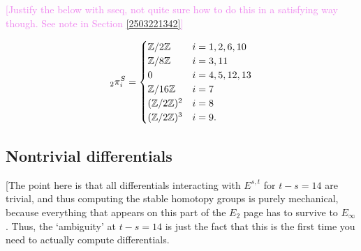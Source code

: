 \documentclass{MetricNotes2023}
\def\bb{\ensuremath\mathbb}
\def\inte{\ensuremath\mathbb{Z}}
\DeclareMathOperator{\Ext}{Ext}
\def\textcolour{\textcolor}
\begin{document}

\textcolour{violet}{[Justify the below with sseq, not quite sure how to do this in a satisfying way though. See note in Section \ref{2503221342}]}

\begin{theorem}
\begin{align*}
\text{}_{2}\pi_i^S = \begin{cases}
\inte/2\inte & i = 1, 2, 6,10\\
\inte/8\inte & i = 3, 11\\
0 & i = 4, 5, 12, 13\\
\inte/16\inte & i = 7\\
(\inte/2\inte)^2 & i = 8\\
(\inte/2\inte)^3 & i=9.
\end{cases}
\end{align*}
\end{theorem}

\subsection{Nontrivial differentials}

[The point here is that all differentials interacting with \(E^{s,t}\) for \(t-s=14\) are trivial, and thus computing the stable homotopy groups is purely mechanical, because everything that appears on this part of the \(E_2\) page has to survive to \(E_\infty\). Thus, the `ambiguity' at \(t-s=14\) is just the fact that this is the first time you need to actually compute differentials.
\end{document}
